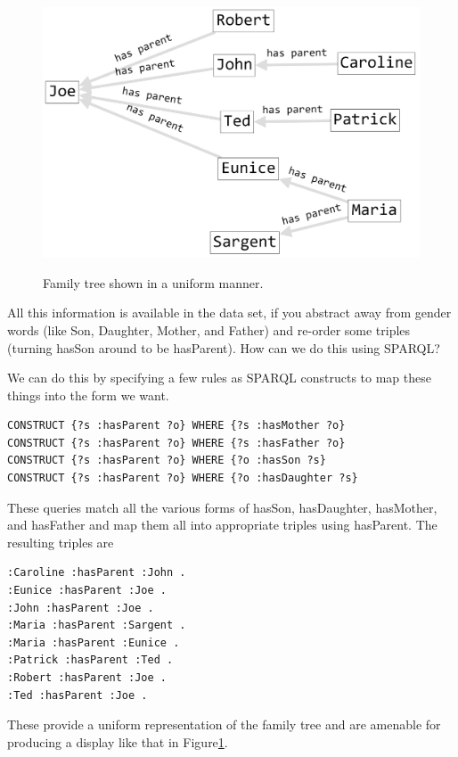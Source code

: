 \begin{challenge}
\begin{figure}
\centering
\includegraphics[width=5in]{SWWOv3/media/ch6/figure6-9.png}
\label{fig:ch6.9}
\caption{Family tree shown in a uniform manner.}
\end{figure}

All this information is available in the data set, if you abstract away
from gender words (like Son, Daughter, Mother, and Father) and re-order
some triples (turning hasSon around to be hasParent). How can we do this
using SPARQL?

We can do this by specifying a few rules as SPARQL constructs to map
these things into the form we want.

\begin{lstlisting}
CONSTRUCT {?s :hasParent ?o} WHERE {?s :hasMother ?o} 
CONSTRUCT {?s :hasParent ?o} WHERE {?s :hasFather ?o} 
CONSTRUCT {?s :hasParent ?o} WHERE {?o :hasSon ?s} 
CONSTRUCT {?s :hasParent ?o} WHERE {?o :hasDaughter ?s}
\end{lstlisting}

These queries match all the various forms of hasSon, hasDaughter,
hasMother, and hasFather and map them all into appropriate triples using
hasParent. The resulting triples are


\begin{lstlisting}
:Caroline :hasParent :John .
:Eunice :hasParent :Joe .
:John :hasParent :Joe .
:Maria :hasParent :Sargent .
:Maria :hasParent :Eunice .
:Patrick :hasParent :Ted .
:Robert :hasParent :Joe .
:Ted :hasParent :Joe .
\end{lstlisting}

These provide a uniform representation of the family tree and are
amenable for producing a display like that in 
Figure\ref{fig:ch6.9}.


\end{challenge}
